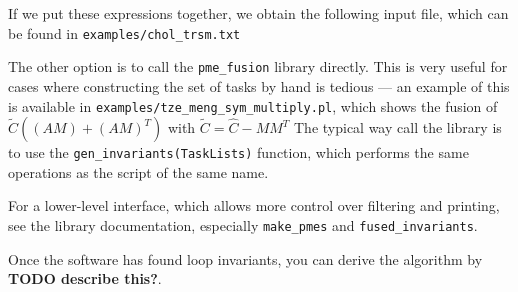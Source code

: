 \documentclass[12pt,letterpaper]{article}
\begin{document}
If we put these expressions together, we obtain the following input file, which can be found in \texttt{examples/chol\_trsm.txt}
{\small }

The other option is to call the \texttt{pme\_fusion} library directly.
This is very useful for cases where constructing the set of tasks by hand is tedious --- an example of this is available in \texttt{examples/tze\_meng\_sym\_multiply.pl}, which shows the fusion of $\widetilde{C} ((AM) + (AM)^T)$ with $\widetilde{C} = \hat{C} - MM^T$
The typical way call the library is to use the \texttt{gen\_invariants(TaskLists)} function, which performs the same operations as the script of the same name.

For a lower-level interface, which allows more control over filtering and printing, see the library documentation, especially \texttt{make\_pmes} and \texttt{fused\_invariants}.

Once the software has found loop invariants, you can derive the algorithm by \textbf{TODO describe this?}.
\end{document}
